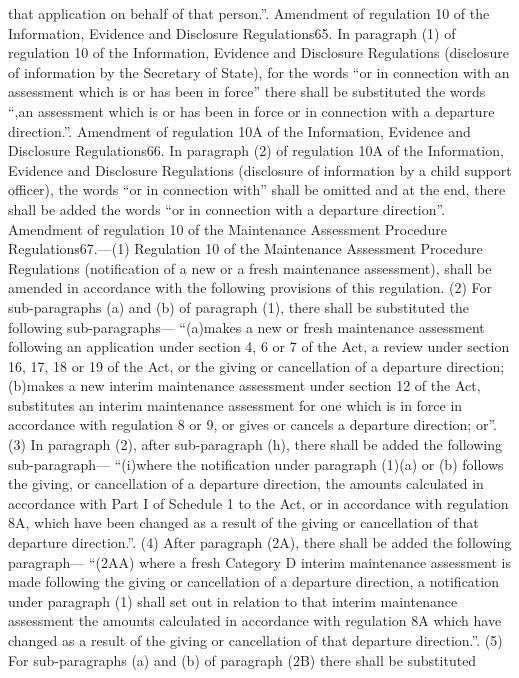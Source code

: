 \documentclass[a4paper]{article}
\begin{document}
that application on behalf of that person.”.
Amendment of regulation 10 of the Information, Evidence and Disclosure
Regulations65. In paragraph (1) of regulation 10 of the Information, Evidence
and Disclosure Regulations (disclosure of information by the Secretary of
State), for the words “or in connection with an assessment which is or has been
in force” there shall be substituted the words “,an assessment which is or has
been in force or in connection with a departure direction.”.
Amendment of regulation 10A of the Information, Evidence and Disclosure
Regulations66. In paragraph (2) of regulation 10A of the Information, Evidence
and Disclosure Regulations (disclosure of information by a child support
officer), the words “or in connection with” shall be omitted and at the end,
there shall be added the words “or in connection with a departure direction”.
Amendment of regulation 10 of the Maintenance Assessment Procedure
Regulations67.—(1) Regulation 10 of the Maintenance Assessment Procedure
Regulations (notification of a new or a fresh maintenance assessment), shall be
amended in accordance with the following provisions of this regulation.
(2) For sub-paragraphs (a) and (b) of paragraph (1), there shall be substituted
the following sub-paragraphs—
“(a)makes a new or fresh maintenance assessment following an application under
section 4, 6 or 7 of the Act, a review under section 16, 17, 18 or 19 of the
Act, or the giving or cancellation of a departure direction;
(b)makes a new interim maintenance assessment under section 12 of the Act,
substitutes an interim maintenance assessment for one which is in force in
accordance with regulation 8 or 9, or gives or cancels a departure direction;
or”.
(3) In paragraph (2), after sub-paragraph (h), there shall be added the
following sub-paragraph—
“(i)where the notification under paragraph (1)(a) or (b) follows the giving, or
cancellation of a departure direction, the amounts calculated in accordance with
Part I of Schedule 1 to the Act, or in accordance with regulation 8A, which have
been changed as a result of the giving or cancellation of that departure
direction.”.
(4) After paragraph (2A), there shall be added the following paragraph—
“(2AA) where a fresh Category D interim maintenance assessment is made following
the giving or cancellation of a departure direction, a notification under
paragraph (1) shall set out in relation to that interim maintenance assessment
the amounts calculated in accordance with regulation 8A which have changed as a
result of the giving or cancellation of that departure direction.”.
(5) For sub-paragraphs (a) and (b) of paragraph (2B) there shall be substituted
\end{document}
